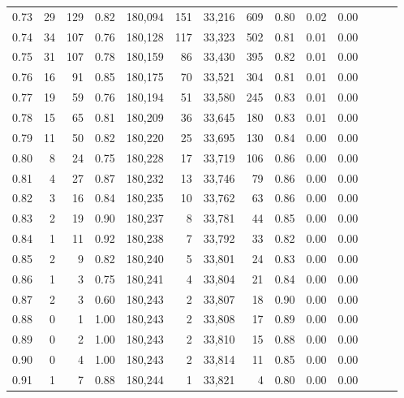 \begin{tabular}{rrrrrrrrrrrrrr}
0.73 &     29 &  129 &  0.82 &  180,094 &      151 &  33,216 &     609 &  0.80 &  0.02 &      0.00 \\
0.74 &     34 &  107 &  0.76 &  180,128 &      117 &  33,323 &     502 &  0.81 &  0.01 &      0.00 \\
0.75 &     31 &  107 &  0.78 &  180,159 &       86 &  33,430 &     395 &  0.82 &  0.01 &      0.00 \\
0.76 &     16 &   91 &  0.85 &  180,175 &       70 &  33,521 &     304 &  0.81 &  0.01 &      0.00 \\
0.77 &     19 &   59 &  0.76 &  180,194 &       51 &  33,580 &     245 &  0.83 &  0.01 &      0.00 \\
0.78 &     15 &   65 &  0.81 &  180,209 &       36 &  33,645 &     180 &  0.83 &  0.01 &      0.00 \\
0.79 &     11 &   50 &  0.82 &  180,220 &       25 &  33,695 &     130 &  0.84 &  0.00 &      0.00 \\
0.80 &      8 &   24 &  0.75 &  180,228 &       17 &  33,719 &     106 &  0.86 &  0.00 &      0.00 \\
0.81 &      4 &   27 &  0.87 &  180,232 &       13 &  33,746 &      79 &  0.86 &  0.00 &      0.00 \\
0.82 &      3 &   16 &  0.84 &  180,235 &       10 &  33,762 &      63 &  0.86 &  0.00 &      0.00 \\
0.83 &      2 &   19 &  0.90 &  180,237 &        8 &  33,781 &      44 &  0.85 &  0.00 &      0.00 \\
0.84 &      1 &   11 &  0.92 &  180,238 &        7 &  33,792 &      33 &  0.82 &  0.00 &      0.00 \\
0.85 &      2 &    9 &  0.82 &  180,240 &        5 &  33,801 &      24 &  0.83 &  0.00 &      0.00 \\
0.86 &      1 &    3 &  0.75 &  180,241 &        4 &  33,804 &      21 &  0.84 &  0.00 &      0.00 \\
0.87 &      2 &    3 &  0.60 &  180,243 &        2 &  33,807 &      18 &  0.90 &  0.00 &      0.00 \\
0.88 &      0 &    1 &  1.00 &  180,243 &        2 &  33,808 &      17 &  0.89 &  0.00 &      0.00 \\
0.89 &      0 &    2 &  1.00 &  180,243 &        2 &  33,810 &      15 &  0.88 &  0.00 &      0.00 \\
0.90 &      0 &    4 &  1.00 &  180,243 &        2 &  33,814 &      11 &  0.85 &  0.00 &      0.00 \\
0.91 &      1 &    7 &  0.88 &  180,244 &        1 &  33,821 &       4 &  0.80 &  0.00 &      0.00 \\

\end{tabular}
